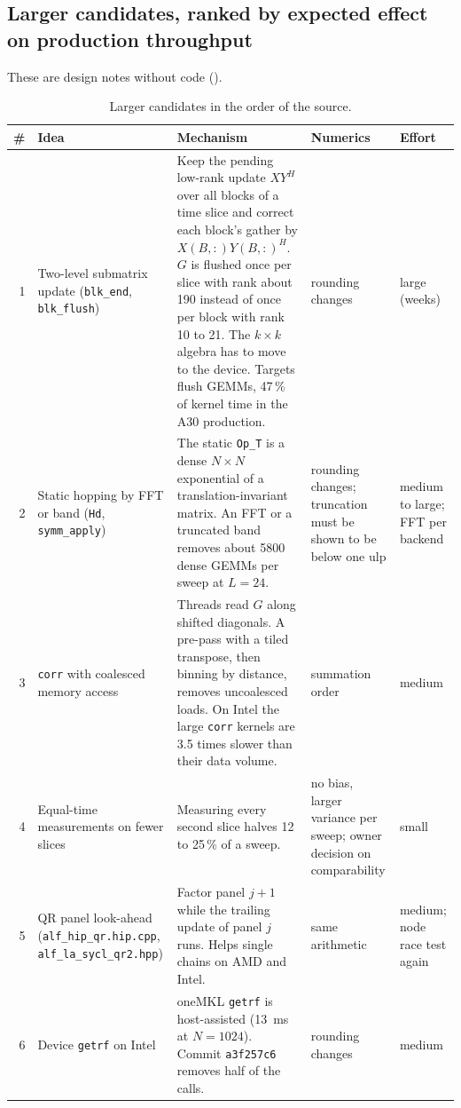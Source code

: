 \subsection{Larger candidates, ranked by expected effect on production throughput}

These are design notes without code ().

\begin{table}[h]
\centering
\caption{Larger candidates in the order of the source.}
\label{tab:larger}
\small
\begin{tabularx}{\textwidth}{@{}rp{3cm}Xp{2.4cm}p{1.9cm}@{}}
\toprule
\# & Idea & Mechanism & Numerics & Effort \\
\midrule
1 & Two-level submatrix update (\texttt{blk\_end}, \texttt{blk\_flush}) & Keep the pending low-rank update $XY^H$ over all blocks of a time slice and correct each block's gather by $X(B,:)Y(B,:)^H$. $G$ is flushed once per slice with rank about 190 instead of once per block with rank 10 to 21. The $k\times k$ algebra has to move to the device. Targets flush GEMMs, 47\,\% of kernel time in the A30 production. & rounding changes & large (weeks) \\ %
2 & Static hopping by FFT or band (\texttt{Hd}, \texttt{symm\_apply}) & The static \texttt{Op\_T} is a dense $N\times N$ exponential of a translation-invariant matrix. An FFT or a truncated band removes about 5800 dense GEMMs per sweep at $L=24$. & rounding changes; truncation must be shown to be below one ulp & medium to large; FFT per backend \\ %
3 & \texttt{corr} with coalesced memory access & Threads read $G$ along shifted diagonals. A pre-pass with a tiled transpose, then binning by distance, removes uncoalesced loads. On Intel the large \texttt{corr} kernels are 3.5 times slower than their data volume. & summation order & medium \\ %
4 & Equal-time measurements on fewer slices & Measuring every second slice halves 12 to 25\,\% of a sweep. & no bias, larger variance per sweep; owner decision on comparability & small \\ %
5 & QR panel look-ahead (\texttt{alf\_hip\_qr.hip.cpp}, \texttt{alf\_la\_sycl\_qr2.hpp}) & Factor panel $j+1$ while the trailing update of panel $j$ runs. Helps single chains on AMD and Intel. & same arithmetic & medium; node race test again \\ %
6 & Device \texttt{getrf} on Intel & oneMKL \texttt{getrf} is host-assisted (13~ms at $N=1024$). Commit \texttt{a3f257c6} removes half of the calls. & rounding changes & medium \\ %
\bottomrule
\end{tabularx}
\end{table}

